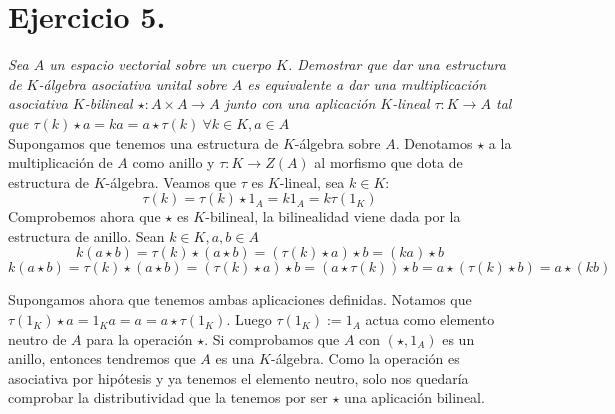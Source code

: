 
\section{Ejercicio 5.} \emph{Sea \(A\) un espacio vectorial sobre un cuerpo
  \(K\). Demostrar que dar una estructura de \(K\)-álgebra asociativa unital
  sobre \(A\) es equivalente a dar una multiplicación asociativa \(K\)-bilineal \(\star :A
  \times A \to A\) junto con una aplicación \(K\)-lineal \(\tau : K \to A\) tal
  que \(\tau(k)\star a = ka = a \star \tau(k) \ \forall k \in K, a \in A\)}\\

Supongamos que tenemos una estructura de \(K\)-álgebra sobre \(A\). Denotamos \(\star\) a la
multiplicación de \(A\) como anillo y \(\tau :K \to Z(A)\) al morfismo que dota
de estructura de \(K\)-álgebra.
 Veamos que \(\tau\) es \(K\)-lineal, sea \(k \in K\):
\[
\tau(k) = \tau(k) \star 1_A = k1_A = k \tau(1_K)
\]
Comprobemos ahora que \(\star\) es \(K\)-bilineal, la bilinealidad viene dada
por la estructura de anillo. Sean \(k \in K, a,b \in A\)
\[
k(a \star b) = \tau(k) \star (a \star b) = (\tau(k) \star a) \star b = (ka)
\star b
\]
\[
k(a \star b) = \tau(k) \star (a \star b) = (\tau(k) \star a) \star b = (a \star
\tau(k)) \star b = a \star (\tau(k) \star b) = a \star (kb)
\]

Supongamos ahora que tenemos ambas aplicaciones definidas. Notamos
que \(\tau(1_K)\star a = 1_Ka = a = a\star
\tau(1_K)\). Luego \(\tau(1_K) := 1_A\) actua como elemento
neutro de \(A\) para la operación \(\star\). Si comprobamos que \(A\) con
\((\star, 1_A)\) es un anillo, entonces tendremos que \(A\) es una
\(K\)-álgebra. Como la operación es asociativa por hipótesis y ya tenemos el
elemento neutro, solo nos quedaría comprobar la distributividad que la tenemos
por ser \(\star\) una aplicación bilineal.
